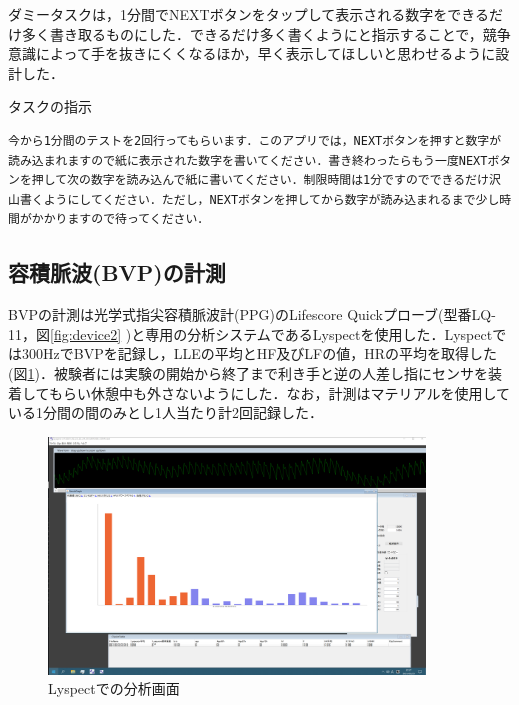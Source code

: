 ダミータスクは，1分間でNEXTボタンをタップして表示される数字をできるだけ多く書き取るものにした．できるだけ多く書くようにと指示することで，競争意識によって手を抜きにくくなるほか，早く表示してほしいと思わせるように設計した．

\begin{itembox}[l]{タスクの指示}
\begin{verbatim}
今から1分間のテストを2回行ってもらいます．このアプリでは，NEXTボタンを押すと数字が読み込まれますので紙に表示された数字を書いてください．書き終わったらもう一度NEXTボタンを押して次の数字を読み込んで紙に書いてください．制限時間は1分ですのでできるだけ沢山書くようにしてください．ただし，NEXTボタンを押してから数字が読み込まれるまで少し時間がかかりますので待ってください．
\end{verbatim}
\end{itembox}

\subsection{容積脈波(BVP)の計測}
BVPの計測は光学式指尖容積脈波計(PPG)のLifescore Quickプローブ(型番LQ-11，図\ref{fig:device2} )と専用の分析システムであるLyspect\cite{chaotechlyspect}を使用した．Lyspectでは300HzでBVPを記録し，LLEの平均とHF及びLFの値，HRの平均を取得した(図\ref{fig:lyspect})．被験者には実験の開始から終了まで利き手と逆の人差し指にセンサを装着してもらい休憩中も外さないようにした．なお，計測はマテリアルを使用している1分間の間のみとし1人当たり計2回記録した．

\begin{figure}[htbp]
  \begin{minipage}{\hsize}
    \begin{center}
       \includegraphics[width=100mm]{img/lyspect.png}
    \end{center}
    \caption{Lyspectでの分析画面}
    \label{fig:lyspect}
  \end{minipage}
\end{figure}


